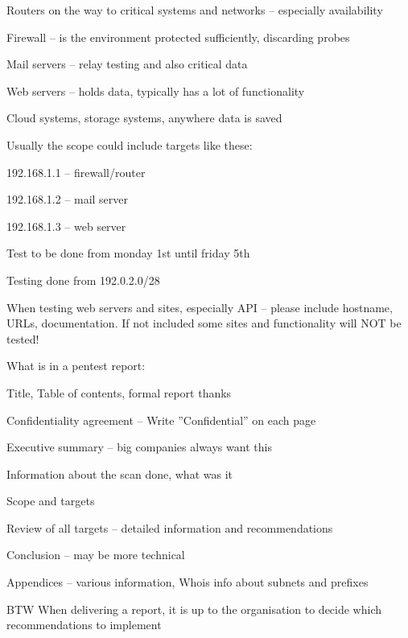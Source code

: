 \documentclass[Screen16to9,17pt]{foils}
\begin{document}

\begin{list2}
\item Routers on the way to critical systems and networks -- especially availability
\item Firewall -- is the environment protected sufficiently, discarding probes
\item Mail servers -- relay testing and also critical data
\item Web servers -- holds data, typically has a lot of functionality
\item Cloud systems, storage systems, anywhere data is saved
\end{list2}



\begin{list1}
\item Usually the scope could include targets like these:
\begin{list2}
\item 192.168.1.1 -- firewall/router
\item 192.168.1.2 -- mail server
\item 192.168.1.3 -- web server
\item Test to be done from monday 1st until friday 5th
\item Testing done from 192.0.2.0/28
\end{list2}
\item When testing web servers and sites, especially API -- please include hostname, URLs, documentation. If not included some sites and functionality will NOT be tested!
\end{list1}



\begin{list1}
\item What is in a pentest report:
\begin{list2}
\item Title, Table of contents, formal report thanks
\item Confidentiality agreement – Write ”Confidential” on each page
\item Executive summary – big companies always want this
\item Information about the scan done, what was it
\item Scope and targets
\item Review of all targets – detailed information and recommendations
\item Conclusion – may be more technical
\item Appendices – various information, Whois info about subnets and prefixes
\end{list2}
\item BTW When delivering a report, it is up to the organisation to decide which recommendations to implement
\end{list1}
\end{document}
